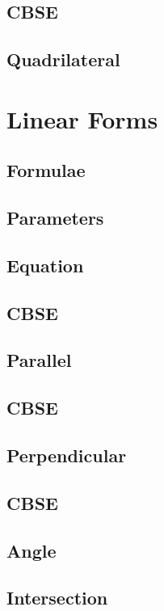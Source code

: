 \documentclass[journal]{IEEEtran}
\begin{document}
\subsection{CBSE}

\subsection{Quadrilateral}

\newpage
\section{Linear Forms}
\subsection{Formulae}

\subsection{Parameters}

\subsection{Equation }

\subsection{CBSE}

\subsection{Parallel}

\subsection{CBSE}

\subsection{Perpendicular}

\subsection{CBSE}

\subsection{Angle}

\subsection{Intersection}

\end{document}
